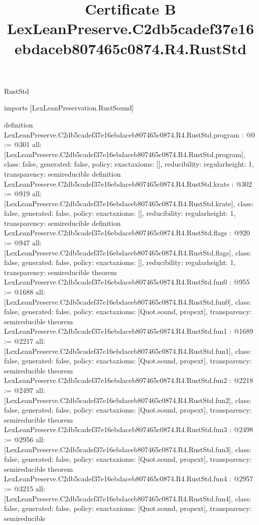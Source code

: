 \begin{lexlean}{RustStd}
\title{Certificate B LexLeanPreserve.C2db5cadef37e16ebdaceb807465c0874.R4.RustStd}
\begin{coremodule}
imports [LexLeanPreservation.RustSound]

definition LexLeanPreserve.C2db5cadef37e16ebdaceb807465c0874.R4.RustStd.program : @0 := @301 {
  all: [LexLeanPreserve.C2db5cadef37e16ebdaceb807465c0874.R4.RustStd.program],
  class: false,
  generated: false,
  policy: exact{axioms: []},
  reducibility: regular{height: 1},
  transparency: semireducible
}
definition LexLeanPreserve.C2db5cadef37e16ebdaceb807465c0874.R4.RustStd.krate : @302 := @919 {
  all: [LexLeanPreserve.C2db5cadef37e16ebdaceb807465c0874.R4.RustStd.krate],
  class: false,
  generated: false,
  policy: exact{axioms: []},
  reducibility: regular{height: 1},
  transparency: semireducible
}
definition LexLeanPreserve.C2db5cadef37e16ebdaceb807465c0874.R4.RustStd.flags : @920 := @947 {
  all: [LexLeanPreserve.C2db5cadef37e16ebdaceb807465c0874.R4.RustStd.flags],
  class: false,
  generated: false,
  policy: exact{axioms: []},
  reducibility: regular{height: 1},
  transparency: semireducible
}
theorem LexLeanPreserve.C2db5cadef37e16ebdaceb807465c0874.R4.RustStd.fun0 : @955 := @1688 {
  all: [LexLeanPreserve.C2db5cadef37e16ebdaceb807465c0874.R4.RustStd.fun0],
  class: false,
  generated: false,
  policy: exact{axioms: [Quot.sound, propext]},
  transparency: semireducible
}
theorem LexLeanPreserve.C2db5cadef37e16ebdaceb807465c0874.R4.RustStd.fun1 : @1689 := @2217 {
  all: [LexLeanPreserve.C2db5cadef37e16ebdaceb807465c0874.R4.RustStd.fun1],
  class: false,
  generated: false,
  policy: exact{axioms: [Quot.sound, propext]},
  transparency: semireducible
}
theorem LexLeanPreserve.C2db5cadef37e16ebdaceb807465c0874.R4.RustStd.fun2 : @2218 := @2497 {
  all: [LexLeanPreserve.C2db5cadef37e16ebdaceb807465c0874.R4.RustStd.fun2],
  class: false,
  generated: false,
  policy: exact{axioms: [Quot.sound, propext]},
  transparency: semireducible
}
theorem LexLeanPreserve.C2db5cadef37e16ebdaceb807465c0874.R4.RustStd.fun3 : @2498 := @2956 {
  all: [LexLeanPreserve.C2db5cadef37e16ebdaceb807465c0874.R4.RustStd.fun3],
  class: false,
  generated: false,
  policy: exact{axioms: [Quot.sound, propext]},
  transparency: semireducible
}
theorem LexLeanPreserve.C2db5cadef37e16ebdaceb807465c0874.R4.RustStd.fun4 : @2957 := @3215 {
  all: [LexLeanPreserve.C2db5cadef37e16ebdaceb807465c0874.R4.RustStd.fun4],
  class: false,
  generated: false,
  policy: exact{axioms: [Quot.sound, propext]},
  transparency: semireducible
}
\end{coremodule}
\end{lexlean}
